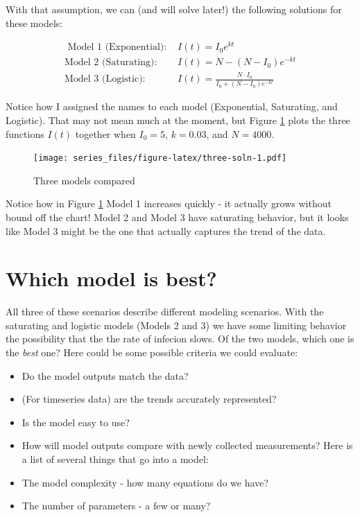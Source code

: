 \documentclass[
]{book}
\providecommand{\tightlist}{%
  \setlength{\itemsep}{0pt}\setlength{\parskip}{0pt}}
\theoremstyle{definition}
\theoremstyle{definition}
\theoremstyle{definition}
\theoremstyle{remark}
\begin{document}
With that assumption, we can (and will solve later!) the following solutions for these models:

\begin{align*}
\mbox{ Model 1 (Exponential): } & I(t) = I_{0}e^{kt} \\
\mbox{Model 2 (Saturating): } & I(t) = N-(N-I_{0})e^{-kt} \\
\mbox{Model 3 (Logistic): } & I(t) = \frac{N \cdot I_{0} }{I_{0}+(N-I_{0})e^{-kt}}
\end{align*}

Notice how I assigned the names to each model (Exponential, Saturating, and Logistic). That may not mean much at the moment, but Figure \ref{fig:three-soln} plots the three functions \(I(t)\) together when \(I_{0}=5\), \(k=0.03\), and \(N=4000\).

\begin{figure}
\centering
\texttt{[image: series\_files/figure-latex/three-soln-1.pdf]}
\caption{\label{fig:three-soln}Three models compared}
\end{figure}

Notice how in Figure \ref{fig:three-soln} Model 1 increases quickly - it actually grows without bound off the chart! Model 2 and Model 3 have saturating behavior, but it looks like Model 3 might be the one that actually captures the trend of the data.

\hypertarget{which-model-is-best}{%
\section{Which model is best?}\label{which-model-is-best}}

All three of these scenarios describe different modeling scenarios. With the saturating and logistic models (Models 2 and 3) we have some limiting behavior the possibility that the the rate of infecion slows. Of the two models, which one is the \emph{best} one? Here could be some possible criteria we could evaluate:

\begin{itemize}
\tightlist
\item
  Do the model outputs match the data?
\item
  (For timeseries data) are the trends accurately represented?
\item
  Is the model easy to use?
\item
  How will model outputs compare with newly collected measurements?
  Here is a list of several things that go into a model:
\item
  The model complexity - how many equations do we have?
\item
  The number of parameters - a few or many?
\end{itemize}
\end{document}
